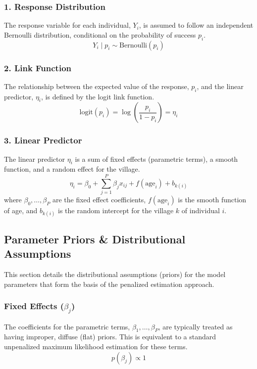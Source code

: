 \documentclass[11pt, a4paper]{article}
\begin{document}
\subsubsection{1. Response Distribution}
The response variable for each individual, $Y_i$, is assumed to follow an independent Bernoulli distribution, conditional on the probability of success $p_i$.
\begin{equation*}
    Y_i \mid p_i \sim \text{Bernoulli}(p_i)
\end{equation*}

\subsubsection{2. Link Function}
The relationship between the expected value of the response, $p_i$, and the linear predictor, $\eta_i$, is defined by the logit link function.
\begin{equation*}
    \text{logit}(p_i) = \log\left(\frac{p_i}{1-p_i}\right) = \eta_i
\end{equation*}

\subsubsection{3. Linear Predictor}
The linear predictor $\eta_i$ is a sum of fixed effects (parametric terms), a smooth function, and a random effect for the village.
\begin{equation*}
    \eta_i = \beta_0 + \sum_{j=1}^{P} \beta_j x_{ij} + f(\text{age}_i) + b_{k(i)}
\end{equation*}
where $\beta_0, \dots, \beta_P$ are the fixed effect coefficients, $f(\text{age}_i)$ is the smooth function of age, and $b_{k(i)}$ is the random intercept for the village $k$ of individual $i$.

\subsection{Parameter Priors \& Distributional Assumptions}

This section details the distributional assumptions (priors) for the model parameters that form the basis of the penalized estimation approach.

\subsubsection{Fixed Effects ($\beta_j$)}
The coefficients for the parametric terms, $\beta_1, \dots, \beta_P$, are typically treated as having improper, diffuse (flat) priors. This is equivalent to a standard unpenalized maximum likelihood estimation for these terms.
\begin{equation*}
    p(\beta_j) \propto 1
\end{equation*}
\end{document}
